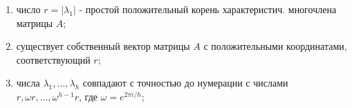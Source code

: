 \documentclass[10pt]{article}
\begin{document}
\begin{enumerate}

  \item число $r=\left|\lambda_{1}\right|$ - простой положительный корень характеристич. многочлена матрицы $A$;



  \item существует собственный вектор матрицы $A$ с положительными координатами, соответствующий $r$;



  \item числа $\lambda_{1}, \ldots, \lambda_{h}$ совпадают с точностью до нумерации с числами $r, \omega r, \ldots, \omega^{h-1} r$, где $\omega=e^{2 \pi i / h}$;



\end{enumerate}
\end{document}
